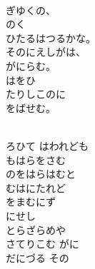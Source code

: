\documentclass[10pt,b5j]{tarticle} %
\begin{document}
\vspace{1.5em} %
\newcommand{\linespace}{0.5em} %
\newcommand{\blocksize}{0.5\hsize} %
\newcommand{\itemmargin}{3em} %
\begin{enumerate} %
    \setlength{\itemindent}{\itemmargin} %
    \begin{minipage}[c]{\blocksize}
    
        \vspace{\linespace}
        \item~\\
        ぎゆくの、\\
        のく\\
        ひたるはつるかな。\\
        そのにえしがは、\\
        がにらむ。\\
        はをひ\\
        たりしこのに\\
        をばせむ。
        
    \end{minipage}
    \begin{minipage}[c]{\blocksize}
        
        \vspace{\linespace}
        \item~\\
        ろひて はわれども\\
        もはらをさむ\\
        のをはらはむと\\
        むはにたれど\\
        をまむにず\\
        にせし\\
        とらざらめや\\
        さてりこむ がに\\
        だにづる その
        

\end{minipage}
\end{enumerate}
\end{document}
